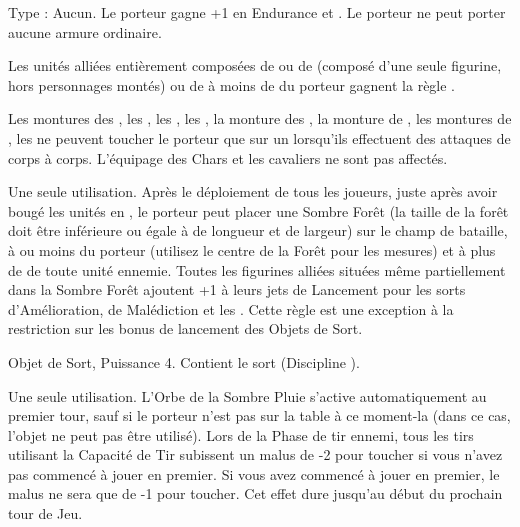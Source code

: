 \endpricelist

\armymagicalarmour

\startpricelist

Type : Aucun. Le porteur gagne +1 en Endurance et . Le porteur ne peut porter aucune armure ordinaire.

\endpricelist

\armytalismans

\startpricelist

Les unités alliées entièrement composées de \razortusks{} ou de \chariots{} (composé d'une seule figurine, hors personnages montés) ou de à moins de  du porteur gagnent la règle \vanguard{}.

Les montures des \chariots{}, les \warbeasts{}, les \monstrousbeasts{}, les \monsters{}, la monture des \riddenmonsters{}, la monture de \cavalry{}, les montures de \monstrouscavalry{}, les \swarms ne peuvent toucher le porteur que sur un  lorsqu'ils effectuent des attaques de corps à corps. L'équipage des Chars et les cavaliers ne sont pas affectés.


\endpricelist

\armyenchanteditems

\startpricelist

Une seule utilisation. Après le déploiement de tous les joueurs, juste après avoir bougé les unités en \vanguard{}, le porteur peut placer une Sombre Forêt (la taille de la forêt doit être inférieure ou égale à  de longueur et  de largeur) sur le champ de bataille, à  ou moins du porteur (utilisez le centre de la Forêt pour les mesures) et à plus de  de toute unité ennemie. Toutes les figurines alliées situées même partiellement dans la Sombre Forêt ajoutent +1 à leurs jets de Lancement pour les sorts d'Amélioration, de Malédiction et les \totems{}. Cette règle est une exception à la restriction sur les bonus de lancement des Objets de Sort.

Objet de Sort, Puissance 4. Contient le sort \wildernessone{} (Discipline \wilderness{}).

Une seule utilisation. L'Orbe de la Sombre Pluie s'active automatiquement au premier tour, sauf si le porteur n'est pas sur la table à ce moment-la (dans ce cas, l'objet ne peut pas être utilisé). Lors de la Phase de tir ennemi, tous les tirs utilisant la Capacité de Tir subissent un malus de -2 pour toucher si vous n'avez pas commencé à jouer en premier. Si vous avez commencé à jouer en premier, le malus ne sera que de -1 pour toucher. Cet effet dure jusqu'au début du prochain tour de Jeu.

